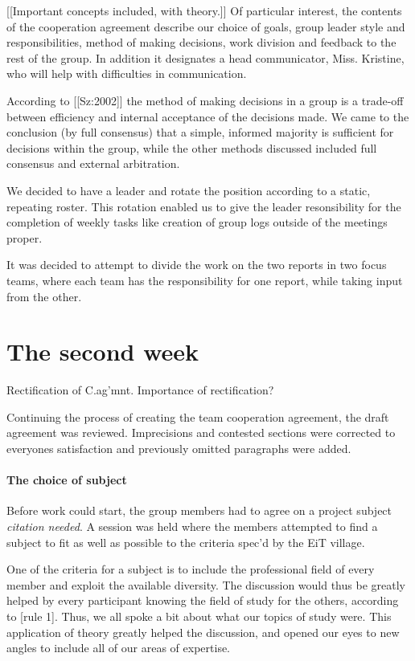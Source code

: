 \documentclass[a4paper, oneside, fleqn, halfparskip]{scrartcl}
\newcommand{\fact}{\emph{citation needed}} %
\begin{document}
[[Important concepts included, with theory.]]
Of particular interest, the contents of the cooperation agreement describe our choice of goals, group leader style and responsibilities, method of making decisions, work division and feedback to the rest of the group. In addition it designates a head communicator, Miss. Kristine, who will help with difficulties in communication.

According to [[Sz:2002]] the method of making decisions in a group is a trade-off between efficiency and internal acceptance of the decisions made. We came to the conclusion (by full consensus) that a simple, informed majority is sufficient for decisions within the group, while the other methods discussed included full consensus and external arbitration. 

We decided to have a leader and rotate the position according to a static, repeating roster. This rotation enabled us to give the leader resonsibility for the completion of weekly tasks like creation of group logs outside of the meetings proper.

It was decided to attempt to divide the work on the two reports in two focus teams, where each team has the responsibility for one report, while taking input from the other.

\section{The second week}

Rectification of C.ag'mnt.
Importance of rectification?

Continuing the process of creating the team cooperation agreement, the draft agreement was reviewed. Imprecisions and contested sections were corrected to everyones satisfaction and previously omitted paragraphs were added. 

\paragraph{The choice of subject}
Before work could start, the group members had to agree on a project subject \fact. A session was held where the members attempted to find a subject to fit as well as possible to the criteria spec'd by the EiT village. 

One of the criteria for a subject is to include the professional field of every member and exploit the available diversity. The discussion would thus be greatly helped by every participant knowing the field of study for the others, according to [rule 1]. Thus, we all spoke a bit about what our topics of study were. This application of theory greatly helped the discussion, and opened our eyes to new angles to include all of our areas of expertise.
\end{document}
